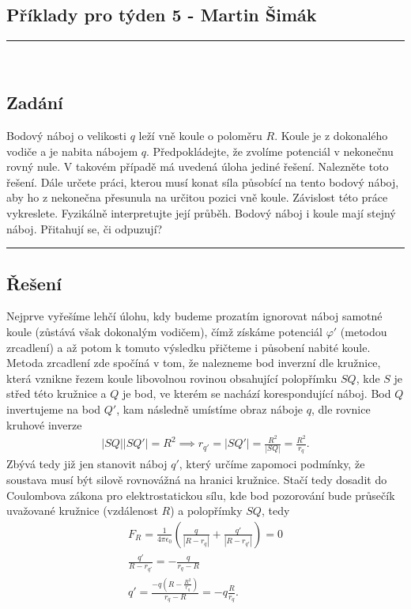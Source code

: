 \documentclass{article}
\def\({\left(}
\def\){\right)}
\def\endl{\\[3mm]}
\begin{document}
	
	\begin{center}
		\section*{Příklady pro týden 5 - Martin Šimák}
		\noindent\rule{15cm}{1.6pt} \\[5mm]
	\end{center}
	
	\subsection*{Zadání}
		 Bodový  náboj  o  velikosti $q$  leží  vně  koule  o  poloměru $R$.  Koule  je  z dokonalého  vodiče  a  je  nabita nábojem $q$.  Předpokládejte,  že  zvolíme  potenciál  v  nekonečnu  rovný  nule. V takovém  případě  má uvedená úloha jediné řešení. Nalezněte toto řešení. Dále určete práci, kterou musí konat síla působící na tento bodový  náboj, aby ho z nekonečna přesunula na určitou pozici  vně koule. Závislost této práce vykreslete. Fyzikálně interpretujte její průběh. Bodový náboj i koule mají stejný náboj. Přitahují se, či odpuzují? \\
		
		\noindent\rule{8cm}{0.4pt}
	
	\subsection*{Řešení}
		Nejprve vyřešíme lehčí úlohu, kdy budeme prozatím ignorovat náboj samotné koule (zůstává však dokonalým vodičem), čímž získáme potenciál $\varphi'$ (metodou zrcadlení) a až potom k tomuto výsledku přičteme i působení nabité koule.\\
		Metoda zrcadlení zde spočíná v tom, že nalezneme bod inverzní dle kružnice, která vznikne řezem koule libovolnou rovinou obsahující polopřímku $SQ$, kde $S$ je střed této kružnice a $Q$ je bod, ve kterém se nachází korespondující náboj. Bod $Q$ invertujeme na bod $Q'$, kam následně umístíme obraz náboje $q$, dle rovnice kruhové inverze
		\begin{align*}
			|SQ| |SQ'| = R^2 \implies r_{q'} = |SQ'| = \frac{R^2}{|SQ|} = \frac{R^2}{r_q} .
		\end{align*}
		Zbývá tedy již jen stanovit náboj $q'$, který určíme zapomoci podmínky, že soustava musí být silově rovnovážná na hranici kružnice. Stačí tedy dosadit do Coulombova zákona pro elektrostatickou sílu, kde bod pozorování bude průsečík uvažované kružnice (vzdálenost $R$) a polopřímky $SQ$, tedy
		\begin{align*}
			F_R = \frac{1}{4\pi\epsilon_0} \( \frac{q}{|R - r_q|} + \frac{q'}{|R - r_{q'}|} \) = 0 \endl
			\frac{q'}{R - r_{q'}} = - \frac{q}{r_q - R} \endl
			q' = \frac{-q \( R - \frac{R^2}{r_q} \)}{r_q - R} = -q \frac{R}{r_q} .
		\end{align*}
		\newpage
		
\end{document}
